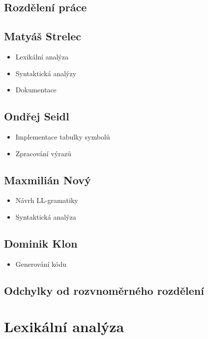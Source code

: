 \documentclass[11pt,a4paper]{article}
\begin{document}
    \subsection{Rozdělení práce}

    \subsection*{Matyáš Strelec}
    \begin{itemize}
        \item Lexikální analýza
        \item Syntaktická analýzy
        \item Dokumentace
    \end{itemize}

    \subsection*{Ondřej Seidl}
    \begin{itemize}
        \item Implementace tabulky symbolů
        \item Zpracování výrazů
    \end{itemize}

    \subsection*{Maxmilián Nový}
    \begin{itemize}
        \item Návrh LL-gramatiky
        \item Syntaktická analýza
    \end{itemize}

    \subsection*{Dominik Klon}
    \begin{itemize}
        \item Generování kódu
    \end{itemize}

    \subsection{Odchylky od rozvnoměrného rozdělení}
    

    \pagebreak{}

    \section{Lexikální analýza}
\end{document}
